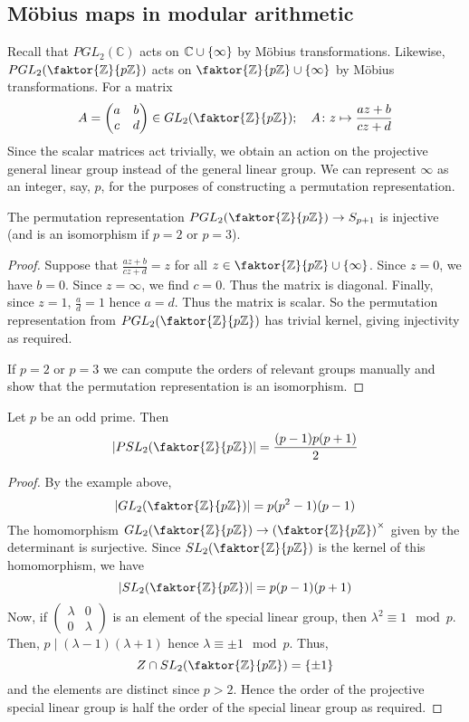 \subsection{M\"obius maps in modular arithmetic}
Recall that \( PGL_2(\mathbb C) \) acts on \( \mathbb C \cup \qty{\infty} \) by M\"obius transformations.
Likewise, \( PGL_2\qty(\faktor{\mathbb Z}{p\mathbb Z}) \) acts on \( \faktor{\mathbb Z}{p\mathbb Z} \cup \qty{\infty} \) by M\"obius transformations.
For a matrix
\[ A = \begin{pmatrix}
	a & b \\
	c & d
\end{pmatrix} \in GL_2\qty(\faktor{\mathbb Z}{p\mathbb Z});\quad A \colon z \mapsto \frac{az+b}{cz+d} \]
Since the scalar matrices act trivially, we obtain an action on the projective general linear group instead of the general linear group.
We can represent \( \infty \) as an integer, say, \( p \), for the purposes of constructing a permutation representation.
\begin{lemma}
	The permutation representation \( PGL_2\qty(\faktor{\mathbb Z}{p\mathbb Z}) \to S_{p+1} \) is injective (and is an isomorphism if \( p = 2 \) or \( p = 3 \)).
\end{lemma}
\begin{proof}
	Suppose that \( \frac{az+b}{cz+d} = z \) for all \( z \in \faktor{\mathbb Z}{p\mathbb Z} \cup \qty{\infty} \).
	Since \( z = 0 \), we have \( b = 0 \).
	Since \( z = \infty \), we find \( c = 0 \).
	Thus the matrix is diagonal.
	Finally, since \( z = 1 \), \( \frac{a}{d} = 1 \) hence \( a = d \).
	Thus the matrix is scalar.
	So the permutation representation from \( PGL_2\qty(\faktor{\mathbb Z}{p \mathbb Z}) \) has trivial kernel, giving injectivity as required.

	If \( p = 2 \) or \( p = 3 \) we can compute the orders of relevant groups manually and show that the permutation representation is an isomorphism.
\end{proof}
\begin{lemma}
	Let \( p \) be an odd prime.
	Then
	\[ \abs{PSL_2\qty(\faktor{\mathbb Z}{p\mathbb Z})} = \frac{(p-1)p(p+1)}{2} \]
\end{lemma}
\begin{proof}
	By the example above,
	\[ \abs{GL_2\qty(\faktor{\mathbb Z}{p\mathbb Z})} = p(p^2 - 1)(p - 1) \]
	The homomorphism \( GL_2\qty(\faktor{\mathbb Z}{p\mathbb Z}) \to \qty(\faktor{\mathbb Z}{p\mathbb Z})^\times \) given by the determinant is surjective.
	Since \( SL_2\qty(\faktor{\mathbb Z}{p\mathbb Z}) \) is the kernel of this homomorphism, we have
	\[ \abs{SL_2\qty(\faktor{\mathbb Z}{p\mathbb Z})} = p(p-1)(p+1) \]
	Now, if \(
	\begin{pmatrix}
	\lambda & 0 \\ 0 & \lambda
	\end{pmatrix}
	\) is an element of the special linear group, then \( \lambda^2 \equiv 1 \mod p \).
	Then, \( p \mid (\lambda - 1)(\lambda + 1) \) hence \( \lambda \equiv \pm 1 \mod p \).
	Thus,
	\[ Z \cap SL_2\qty(\faktor{\mathbb Z}{p\mathbb Z}) = \qty{\pm 1} \]
	and the elements are distinct since \( p > 2 \).
	Hence the order of the projective special linear group is half the order of the special linear group as required.
\end{proof}
